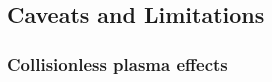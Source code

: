 \subsection{Caveats and Limitations}\label{sec:limits}





\subsubsection{Collisionless plasma effects}


